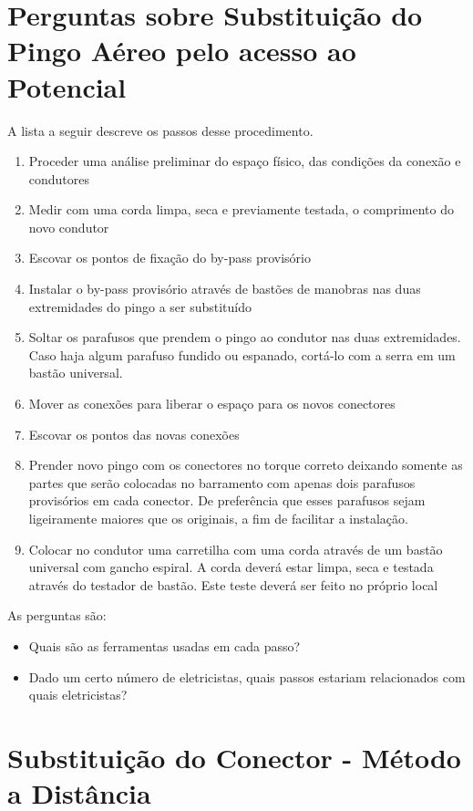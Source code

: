 \section{Perguntas sobre Substituição do Pingo Aéreo pelo acesso ao Potencial} 


A lista a seguir descreve os passos desse procedimento.
\begin{enumerate}
	\item Proceder uma análise preliminar do espaço físico, das condições da conexão e condutores
	\item Medir com uma corda limpa, seca e previamente testada, o comprimento do novo condutor
	\item Escovar os pontos de fixação do by-pass provisório
	\item Instalar o by-pass provisório através de bastões de manobras nas duas extremidades do pingo a ser substituído
	\item Soltar os parafusos que prendem o pingo ao condutor nas duas extremidades. Caso haja algum parafuso fundido ou espanado, cortá-lo com a serra em um bastão universal.
	\item Mover as conexões para liberar o espaço para os novos conectores
	\item Escovar os pontos das novas conexões
	\item Prender novo pingo com os conectores no torque correto deixando somente as partes que serão colocadas no barramento com apenas dois parafusos provisórios em cada conector. De preferência que esses parafusos sejam ligeiramente maiores que os originais, a fim de facilitar a instalação.
	\item Colocar no condutor uma carretilha com uma corda através de um bastão universal com gancho espiral. A corda deverá estar limpa, seca e testada através do testador de bastão. Este teste deverá ser feito no próprio local
\end{enumerate}

As perguntas são:
\begin{itemize}
    \item Quais são as ferramentas usadas em cada passo?
    \item Dado um certo número de eletricistas, quais passos estariam relacionados com quais eletricistas? 
\end{itemize}


\section{Substituição do Conector - Método a Distância}

